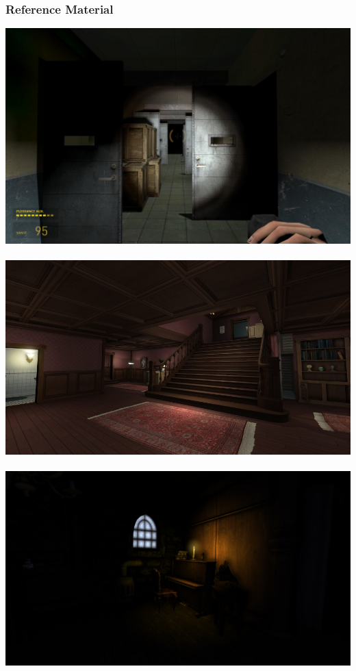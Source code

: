 \documentclass[11pt]{article} %
\begin{document}
\subsubsection{Reference Material}
\includegraphics[scale=.2]{Media/flashlight.jpg} \\ \\
\includegraphics[scale=.3]{Media/gonehome1.jpg} \\ \\
\includegraphics[scale=.2]{Media/insomniamod.jpg} \\ \\
\end{document}
